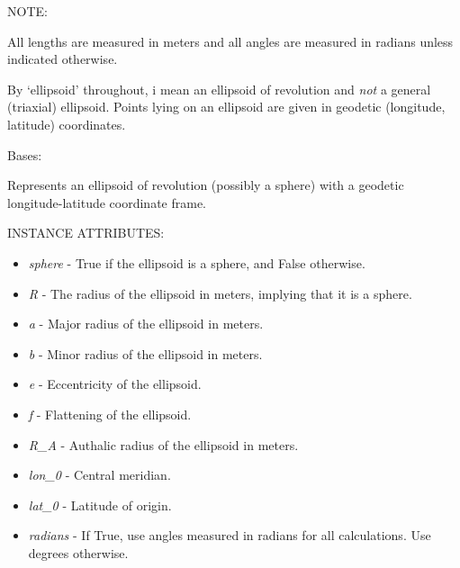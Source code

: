 \documentclass[a4paper,12ptopenany,oneside]{sphinxmanual}
\begin{document}
NOTE:

All lengths are measured in meters and all angles are measured in radians 
unless indicated otherwise.

By `ellipsoid' throughout, i mean an ellipsoid of revolution and \emph{not} a general (triaxial) ellipsoid.
Points lying on an ellipsoid are given in geodetic (longitude, latitude) coordinates.

\begin{fulllineitems}
\label{ellipsoids:rhealpix_dggs.ellipsoids.Ellipsoid}
Bases: 

Represents an ellipsoid of revolution (possibly a sphere) with a 
geodetic longitude-latitude coordinate frame.

INSTANCE ATTRIBUTES:
\begin{itemize}
\item {} 
\emph{sphere} - True if the ellipsoid is a sphere, and False otherwise.

\item {} 
\emph{R} - The radius of the ellipsoid in meters, implying that it is a 
sphere.

\item {} 
\emph{a} - Major radius of the ellipsoid in meters.

\item {} 
\emph{b} - Minor radius of the ellipsoid in meters.

\item {} 
\emph{e} - Eccentricity of the ellipsoid.

\item {} 
\emph{f} - Flattening of the ellipsoid.

\item {} 
\emph{R\_A} - Authalic radius of the ellipsoid in meters.

\item {} 
\emph{lon\_0} - Central meridian.

\item {} 
\emph{lat\_0} - Latitude of origin.

\item {} 
\emph{radians} - If True, use angles measured in radians for all calculations.
Use degrees otherwise.


\end{itemize}
\end{fulllineitems}
\end{document}
